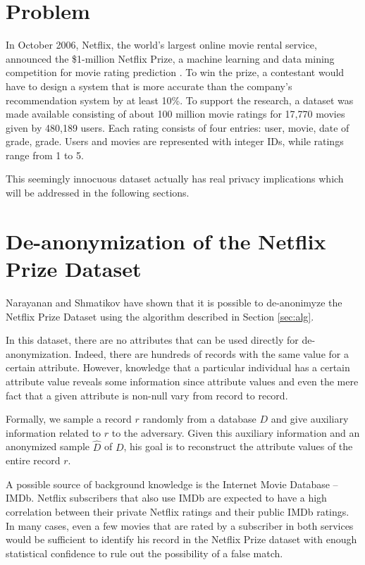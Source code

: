 \documentclass[conference]{IEEEtran}
\begin{document}
\section{Problem}

In October 2006, Netflix, the world's largest online movie rental service, announced the 
\$1-million Netflix Prize, a machine learning and data mining competition for movie rating 
prediction \cite{AndifYou17:online}. To win the prize, a contestant would have to design a system 
that is more accurate than the company's recommendation system by at least 10\%. To support the 
research, a dataset was made available consisting of about 100 million movie ratings for 17,770 
movies given by 480,189 users. Each rating consists of four entries: user, movie, date of grade, 
grade. Users and movies are represented with integer IDs, while ratings range from 1 to 5.

This seemingly innocuous dataset actually has real privacy implications which will be addressed in 
the following sections.

\section{De-anonymization of the Netflix Prize Dataset}

Narayanan and Shmatikov \cite{4531148} have shown that it is possible to de-anonimyze the Netflix 
Prize Dataset using the algorithm described in Section \ref{sec:alg}.

In this dataset, there are no attributes that can be used directly for de-anonymization. Indeed, 
there are hundreds of records with the same value for a certain attribute. However, knowledge that 
a particular individual has a certain attribute value reveals some information since attribute 
values and even the mere fact that a given attribute is non-null vary from record to record.

Formally, we sample a record $r$ randomly from a database $D$ and give auxiliary information 
related to $r$ to the adversary. Given this auxiliary information and an anonymized sample 
$\hat{D}$ of $D$, his goal is to reconstruct the attribute values of the entire record $r$.

A possible source of background knowledge is the Internet Movie Database -- IMDb. Netflix 
subscribers that also use IMDb are expected to have a high correlation between their private 
Netflix ratings and their public IMDb ratings. In many cases, even a few movies that are rated by a 
subscriber in both services would be sufficient to identify his record in the Netflix Prize dataset 
with enough statistical confidence to rule out the possibility of a false match.
\end{document}
